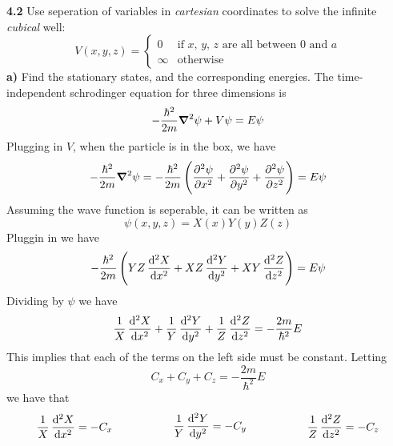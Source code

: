 \documentclass{scrartcl}
\begin{document}
\textbf{4.2} Use seperation of variables in \emph{cartesian} coordinates to solve the infinite \emph{cubical} well:
\begin{displaymath}
V(x,y,z)=
\begin{cases}
0 & \text{if $x$, $y$, $z$ are all between 0 and $a$}\\
\infty & \text{otherwise}
\end{cases}
\end{displaymath}
\textbf{a)} Find the stationary states, and the corresponding energies.
The time-independent schrodinger equation for three dimensions is
\begin{displaymath}
-\frac{\hbar^2}{2m}\grad^2\psi+V\psi=E\psi
\end{displaymath}
Plugging in $V$, when the particle is in the box, we have
\begin{displaymath}
-\frac{\hbar^2}{2m}\grad^2\psi=-\frac{\hbar^2}{2m}\left(\dpd[2]{\psi}{x}+\dpd[2]{\psi}{y}+\dpd[2]{\psi}{z}\right)=E\psi
\end{displaymath}
Assuming the wave function is seperable, it can be written as
\begin{displaymath}
\psi(x,y,z)=X(x)Y(y)Z(z)
\end{displaymath}
Pluggin in we have
\begin{displaymath}
-\frac{\hbar^2}{2m}\left(YZ\dod[2]{X}{x}+XZ\dod[2]{Y}{y}+XY\dod[2]{Z}{z}\right)=E\psi
\end{displaymath}
Dividing by $\psi$ we have
\begin{displaymath}
\frac{1}{X}\dod[2]{X}{x}+\frac{1}{Y}\dod[2]{Y}{y}+\frac{1}{Z}\dod[2]{Z}{z}=-\frac{2m}{\hbar^2}E
\end{displaymath}
This implies that each of the terms on the left side must be constant. Letting
\begin{displaymath}
C_x + C_y + C_z =-\frac{2m}{\hbar^2}E
\end{displaymath}
we have that
\begin{displaymath}
\begin{split}
\frac{1}{X}\dod[2]{X}{x} = -C_x \hspace{0.75 in}
\end{split}
\begin{split}
\frac{1}{Y}\dod[2]{Y}{y} = -C_y \hspace{0.75 in}
\end{split}
\begin{split}
\frac{1}{Z}\dod[2]{Z}{z} = -C_z
\end{split}
\end{displaymath}
\end{document}
